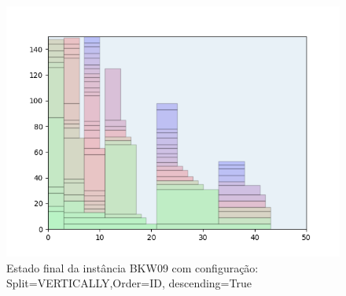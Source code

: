 \begin{figure}[H]
    \centering
    \caption[]{Estado final da instância BKW09 com configuração: Split=VERTICALLY,Order=ID, descending=True}
    \label{fig:bkw09-vertically-id-true}
    \includegraphics[scale=0.5]{output/figures/bkw/bkw09/vertically/id/true/000}
\end{figure}